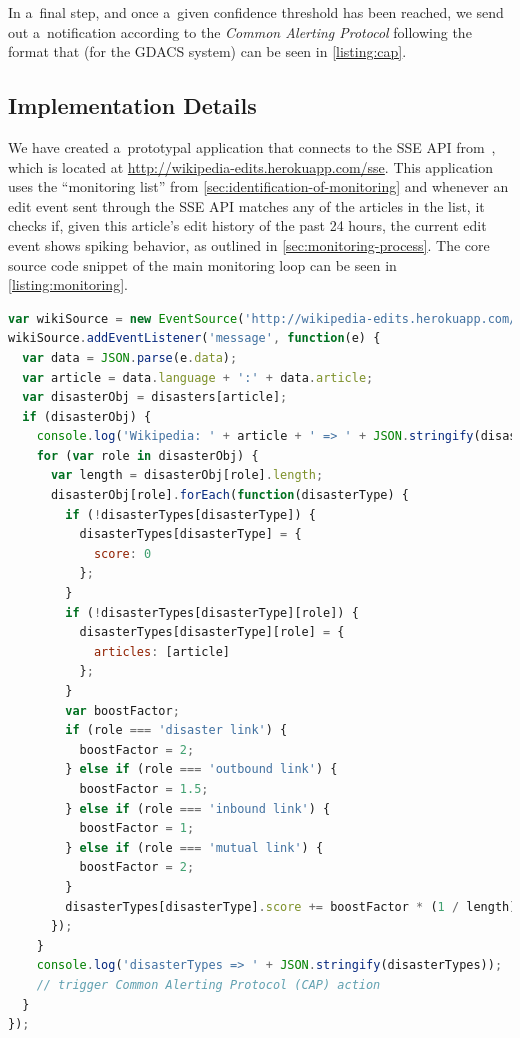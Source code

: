 \documentclass[runningheads,a4paper]{llncs}
\begin{document}
In a~final step, and once a~given confidence threshold has been reached,
we send out a~notification according to the \emph{Common Alerting Protocol}
following the format that (for the GDACS system) can be seen in \autoref{listing:cap}.

\subsection{Implementation Details}

We have created a~prototypal application
that connects to the SSE API from~\cite{steiner2014bots},
which is located at \url{http://wikipedia-edits.herokuapp.com/sse}.
This application uses the ``monitoring list''
from \autoref{sec:identification-of-monitoring}
and whenever an edit event sent through the SSE API
matches any of the articles in the list,
it checks if, given this article's edit history of the past 24 hours,
the current edit event shows spiking behavior,
as outlined in \autoref{sec:monitoring-process}.
The core source code snippet of the main monitoring loop
can be seen in \autoref{listing:monitoring}.

\begin{lstlisting}[caption={Main monitoring loop of the natural disaster monitor},
  label=listing:monitoring, language=JavaScript,
  float=b!, stringstyle=\color{gray},morekeywords={for,if,console,log,addEventListener,JSON,parse,stringify,forEach}]
var wikiSource = new EventSource('http://wikipedia-edits.herokuapp.com/sse');
wikiSource.addEventListener('message', function(e) {
  var data = JSON.parse(e.data);
  var article = data.language + ':' + data.article;
  var disasterObj = disasters[article];
  if (disasterObj) {
    console.log('Wikipedia: ' + article + ' => ' + JSON.stringify(disasterObj));
    for (var role in disasterObj) {
      var length = disasterObj[role].length;
      disasterObj[role].forEach(function(disasterType) {
        if (!disasterTypes[disasterType]) {
          disasterTypes[disasterType] = {
            score: 0
          };
        }
        if (!disasterTypes[disasterType][role]) {
          disasterTypes[disasterType][role] = {
            articles: [article]
          };
        }
        var boostFactor;
        if (role === 'disaster link') {
          boostFactor = 2;
        } else if (role === 'outbound link') {
          boostFactor = 1.5;
        } else if (role === 'inbound link') {
          boostFactor = 1;
        } else if (role === 'mutual link') {
          boostFactor = 2;
        }
        disasterTypes[disasterType].score += boostFactor * (1 / length);
      });
    }
    console.log('disasterTypes => ' + JSON.stringify(disasterTypes));
    // trigger Common Alerting Protocol (CAP) action
  }
});
\end{lstlisting}
\end{document}
